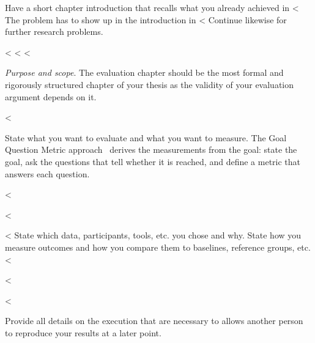 {{{Have a short chapter introduction that recalls what you already achieved in <%
The problem has to show up in the introduction in <%
Continue likewise for further research problems.

<%
<%
<%

\emph{Purpose and scope}.
The evaluation chapter should be the most formal and rigorously structured chapter of your thesis as the validity of your evaluation argument depends on it.

<%

State what you want to evaluate and what you want to measure.
The Goal Question Metric approach~\cite{Basili1994} derives the measurements from the goal: state the goal, ask the questions that tell whether it is reached, and define a metric that answers each question.

<%

<%
\begin{mindflow}
<%
  State which data, participants, tools, etc. you chose and why.
  State how you measure outcomes and how you compare them to baselines, reference groups, etc.
<%
\end{mindflow}
<%

<%

Provide all details on the execution that are necessary to allows another person to reproduce your results at a later point.

}}}
